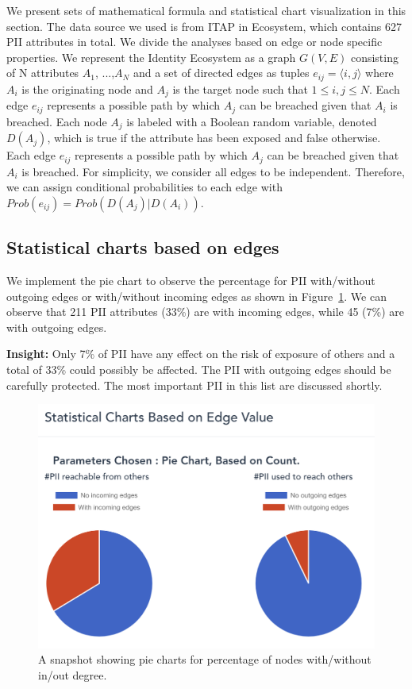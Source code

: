 \documentclass[conference]{IEEEtran}
\begin{document}
We present sets of mathematical formula and statistical chart visualization in this section. The data source we used is from ITAP in Ecosystem, which contains 627 PII attributes in total. We divide the analyses based on edge or node specific properties. We represent the Identity Ecosystem as a graph $G(V, E)$ consisting of N attributes $A_{1}$, ...,$A_{N}$ and a set of directed edges as tuples $e_{ij} = \langle i, j \rangle$ where $A_{i}$ is the originating node and $A_{j}$ is the target node such that $1 \leq i, j \leq N$. Each edge $e_{ij}$ represents a possible path by which $A_{j}$ can be breached given that $A_{i}$ is breached. Each node $A_{j}$ is labeled with a Boolean random variable, denoted $D(A_{j})$, which is true if the attribute has been exposed and false otherwise. Each edge $e_{ij}$ represents a possible path by which $A_{j}$ can be breached given that $A_{i}$ is breached. For simplicity, we consider all edges to be independent. Therefore, we can assign conditional probabilities to each edge with $Prob(e_{ij}) = Prob(D(A_{j})|D(A_{i}))$.

\subsection{Statistical charts based on edges}
We implement the pie chart to observe the percentage for PII with/without outgoing edges or with/without incoming edges as shown in Figure~\ref{fig:pie_pii}. We can observe that 211 PII attributes (33\%) are with incoming edges, while 45 (7\%) are with outgoing edges.

{\bf Insight:} Only 7\% of PII have any effect on the risk of exposure of others and a total of 33\% could possibly be affected. The PII with outgoing edges should be carefully protected. The most important PII in this list are discussed shortly.

\begin{figure}[ht!]
  \includegraphics[width=\linewidth]{pie_PII.png}
  \caption{A snapshot showing pie charts for percentage of nodes with/without in/out degree.}
  \label{fig:pie_pii}
\end{figure}
\end{document}
